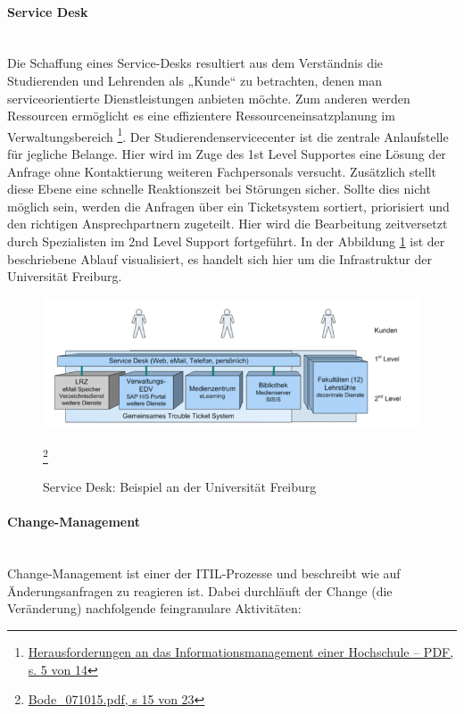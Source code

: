 \paragraph{Service Desk}\mbox{}\\	
Die Schaffung eines Service-Desks resultiert aus dem Verständnis die Studierenden und Lehrenden als „Kunde“ zu betrachten, denen man serviceorientierte Dienstleistungen anbieten möchte. Zum anderen werden Ressourcen ermöglicht es eine effizientere Ressourceneinsatzplanung im Verwaltungsbereich \footnote{\url{Herausforderungen an das Informationsmanagement einer Hochschule – PDF, s. 5 von 14}}. Der Studierendenservicecenter ist die zentrale Anlaufstelle für jegliche Belange. Hier wird im Zuge des 1st Level Supportes eine Lösung der Anfrage ohne Kontaktierung weiteren Fachpersonals versucht. Zusätzlich stellt diese Ebene eine schnelle Reaktionszeit bei Störungen sicher. Sollte dies nicht möglich sein, werden die Anfragen über ein Ticketsystem sortiert, priorisiert und den richtigen Ansprechpartnern zugeteilt. Hier wird die Bearbeitung zeitversetzt durch Spezialisten im 2nd Level Support fortgeführt. In der Abbildung \ref{fig_service_desk} ist der beschriebene Ablauf visualisiert, es handelt sich hier um die Infrastruktur der Universität Freiburg.
 
\begin{figure}[h!]
	\centering
	\includegraphics[width=15cm]{kapitel/gruppe1_2/bilder/ServiceDesk}
	\caption{Service Desk: Beispiel an der Universität Freiburg}  \footnote{\url{Bode_071015.pdf, s 15 von 23}}
	\label{fig_service_desk}
\end{figure}

 

\paragraph{Change-Management}\mbox{}\\
Change-Management ist einer der ITIL-Prozesse und beschreibt wie auf Änderungsanfragen zu reagieren ist. Dabei durchläuft der Change (die Veränderung) nachfolgende feingranulare Aktivitäten:

